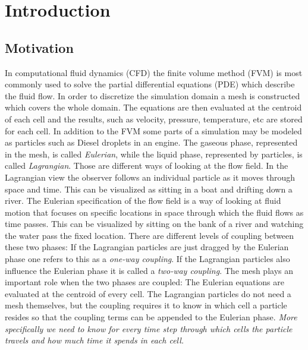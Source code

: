 \section{Introduction}

\subsection{Motivation}

In computational fluid dynamics (CFD) the finite volume method (FVM) is most commonly used to solve the partial differential equations (PDE) which describe the fluid flow. In order to discretize the simulation domain a mesh is constructed which covers the whole domain. The equations are then evaluated at the centroid of each cell and the results, such as velocity, pressure, temperature, etc are stored for each cell. In addition to the FVM some parts of a simulation may be modeled as particles such as Diesel droplets in an engine. \cite{nordin00} The gaseous phase, represented in the mesh, is called \emph{Eulerian}, while the liquid phase, represented by particles, is called \emph{Lagrangian}. Those are different ways of looking at the flow field. In the Lagrangian view the observer follows an individual particle as it moves through space and time. This can be visualized as sitting in a boat and drifting down a river. The Eulerian specification of the flow field is a way of looking at fluid motion that focuses on specific locations in space through which the fluid flows as time passes. This can be visualized by sitting on the bank of a river and watching the water pass the fixed location. \cite{eulerianLagrangian} There are different levels of coupling between these two phases: If the Lagrangian particles are just dragged by the Eulerian phase one refers to this as a \emph{one-way coupling}. If the Lagrangian particles also influence the Eulerian phase it is called a \emph{two-way coupling}. The mesh plays an important role when the two phases are coupled: The Eulerian equations are evaluated at the centroid of every cell. The Lagrangian particles do not need a mesh themselves, but the coupling requires it to know in which cell a particle resides so that the coupling terms can be appended to the Eulerian phase. \emph{More specifically we need to know for every time step through which cells the particle travels and how much time it spends in each cell.}

